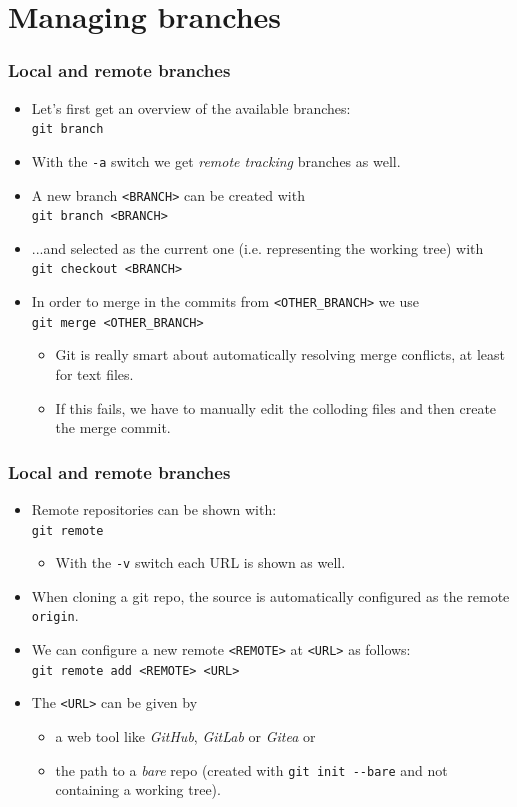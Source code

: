 \documentclass[compress,aspectratio=169]{beamer}
\newcommand{\console}[1]{
  \colorbox{bgcolor}{\texttt{#1}}
}
\begin{document}
\section{Managing branches}

\begin{frame}
  \frametitle{Local and remote branches}
  \begin{itemize}
    \item Let's first get an overview of the available branches:\\\console{git branch}
    \item With the \console{-a} switch we get \textit{remote tracking} branches as well.
    \item A new branch \texttt{<BRANCH>} can be created with\\\console{git branch <BRANCH>}
    \item ...and selected as the current one (i.e. representing the working tree) with\\\console{git checkout <BRANCH>}
    \item In order to merge in the commits from \texttt{<OTHER\_BRANCH>} we use\\\console{git merge <OTHER\_BRANCH>}
      \begin{itemize}
        \item Git is really smart about automatically resolving merge conflicts, at least for text files.
        \item If this fails, we have to manually edit the colloding files and then create the merge commit.
      \end{itemize}
  \end{itemize}
\end{frame}

\begin{frame}
  \frametitle{Local and remote branches}
  \begin{itemize}
    \item Remote repositories can be shown with:\\\console{git remote}
      \begin{itemize}
        \item With the \console{-v} switch each URL is shown as well.
      \end{itemize}
    \item When cloning a git repo, the source is automatically configured as the remote \texttt{origin}.
    \item We can configure a new remote \texttt{<REMOTE>} at \texttt{<URL>} as follows:\\\console{git remote add <REMOTE> <URL>}
    \item The \texttt{<URL>} can be given by
      \begin{itemize}
        \item a web tool like \textit{GitHub}, \textit{GitLab} or \textit{Gitea} or
        \item the path to a \textit{bare} repo (created with \console{git init -\phantom{}-bare} and not containing a working tree).
      \end{itemize}
  \end{itemize}
\end{frame}
\end{document}
